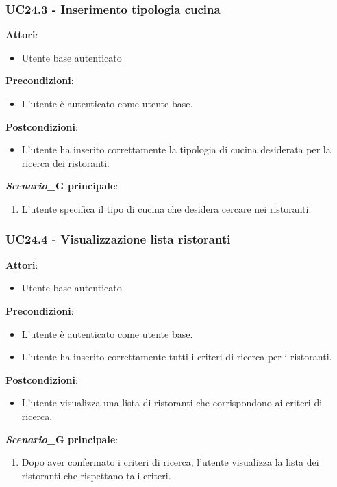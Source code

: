 \subsubsection{UC24.3 - Inserimento tipologia cucina
}\label{usecase:24_3}
\textbf{Attori}:
\begin{itemize}
    \item Utente base autenticato
\end{itemize}
\textbf{Precondizioni}:
\begin{itemize}
    \item L'utente è autenticato come utente base.
\end{itemize}
\textbf{Postcondizioni}:
\begin{itemize}
    \item L'utente ha inserito correttamente la tipologia di cucina desiderata per la ricerca dei ristoranti.
\end{itemize}
\textbf{\textit{Scenario}_G principale}:
\begin{enumerate}
    \item L'utente specifica il tipo di cucina che desidera cercare nei ristoranti.
\end{enumerate}


\subsubsection{UC24.4 - Visualizzazione lista ristoranti
}\label{usecase:24_4}
\textbf{Attori}:
\begin{itemize}
    \item Utente base autenticato
\end{itemize}
\textbf{Precondizioni}:
\begin{itemize}
    \item L'utente è autenticato come utente base.
    \item L'utente ha inserito correttamente tutti i criteri di ricerca per i ristoranti.
\end{itemize}
\textbf{Postcondizioni}:
\begin{itemize}
    \item L'utente visualizza una lista di ristoranti che corrispondono ai criteri di ricerca.
\end{itemize}
\textbf{\textit{Scenario}_G principale}:
\begin{enumerate}
    \item Dopo aver confermato i criteri di ricerca, l'utente visualizza la lista dei ristoranti che rispettano tali criteri.
\end{enumerate}



\newpage